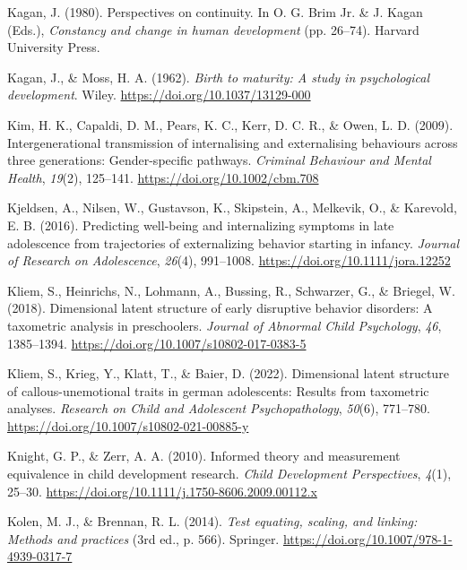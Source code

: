 \documentclass[
  american,
  letterpaper,
  12pt]{article}
\newlength{\cslhangindent}
\newenvironment{CSLReferences}[2] %
 {\begin{list}{}{%
  \setlength{\itemindent}{0pt}
  \setlength{\leftmargin}{0pt}
  \setlength{\parsep}{0pt}
  \ifodd #1
   \setlength{\leftmargin}{\cslhangindent}
   \setlength{\itemindent}{-1\cslhangindent}
  \fi
  \setlength{\itemsep}{#2\baselineskip}}}
 {\end{list}}
\begin{document}
\begin{CSLReferences}{1}{0}
Kagan, J. (1980). Perspectives on continuity. In O. G. Brim Jr. \& J.
Kagan (Eds.), \emph{Constancy and change in human development} (pp.
26--74). Harvard University Press.

Kagan, J., \& Moss, H. A. (1962). \emph{Birth to maturity: {A} study in
psychological development}. Wiley.
\url{https://doi.org/10.1037/13129-000}

Kim, H. K., Capaldi, D. M., Pears, K. C., Kerr, D. C. R., \& Owen, L. D.
(2009). Intergenerational transmission of internalising and
externalising behaviours across three generations: {Gender}-specific
pathways. \emph{Criminal Behaviour and Mental Health}, \emph{19}(2),
125--141. \url{https://doi.org/10.1002/cbm.708}

Kjeldsen, A., Nilsen, W., Gustavson, K., Skipstein, A., Melkevik, O., \&
Karevold, E. B. (2016). Predicting well-being and internalizing symptoms
in late adolescence from trajectories of externalizing behavior starting
in infancy. \emph{Journal of Research on Adolescence}, \emph{26}(4),
991--1008. \url{https://doi.org/10.1111/jora.12252}

Kliem, S., Heinrichs, N., Lohmann, A., Bussing, R., Schwarzer, G., \&
Briegel, W. (2018). Dimensional latent structure of early disruptive
behavior disorders: {A} taxometric analysis in preschoolers.
\emph{Journal of Abnormal Child Psychology}, \emph{46}, 1385--1394.
\url{https://doi.org/10.1007/s10802-017-0383-5}

Kliem, S., Krieg, Y., Klatt, T., \& Baier, D. (2022). Dimensional latent
structure of callous-unemotional traits in german adolescents: Results
from taxometric analyses. \emph{Research on Child and Adolescent
Psychopathology}, \emph{50}(6), 771--780.
\url{https://doi.org/10.1007/s10802-021-00885-y}

Knight, G. P., \& Zerr, A. A. (2010). Informed theory and measurement
equivalence in child development research. \emph{Child Development
Perspectives}, \emph{4}(1), 25--30.
\url{https://doi.org/10.1111/j.1750-8606.2009.00112.x}

Kolen, M. J., \& Brennan, R. L. (2014). \emph{Test equating, scaling,
and linking: {Methods} and practices} (3rd ed., p. 566). Springer.
\url{https://doi.org/10.1007/978-1-4939-0317-7}


\end{CSLReferences}
\end{document}
